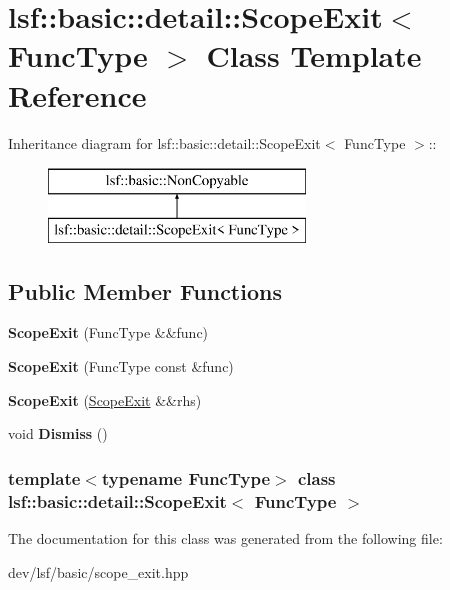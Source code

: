 \hypertarget{classlsf_1_1basic_1_1detail_1_1ScopeExit}{
\section{lsf::basic::detail::ScopeExit$<$ FuncType $>$ Class Template Reference}
\label{classlsf_1_1basic_1_1detail_1_1ScopeExit}
}
Inheritance diagram for lsf::basic::detail::ScopeExit$<$ FuncType $>$::\begin{figure}[H]
\begin{center}
\leavevmode
\includegraphics[height=2cm]{classlsf_1_1basic_1_1detail_1_1ScopeExit}
\end{center}
\end{figure}
\subsection*{Public Member Functions}
\begin{DoxyCompactItemize}
\item 
\hypertarget{classlsf_1_1basic_1_1detail_1_1ScopeExit_a602ab91f3a349ddd1934931d90e57fb1}{
{\bfseries ScopeExit} (FuncType \&\&func)}
\label{classlsf_1_1basic_1_1detail_1_1ScopeExit_a602ab91f3a349ddd1934931d90e57fb1}

\item 
\hypertarget{classlsf_1_1basic_1_1detail_1_1ScopeExit_af772cc24ed6fa8880780806fbf9296a9}{
{\bfseries ScopeExit} (FuncType const \&func)}
\label{classlsf_1_1basic_1_1detail_1_1ScopeExit_af772cc24ed6fa8880780806fbf9296a9}

\item 
\hypertarget{classlsf_1_1basic_1_1detail_1_1ScopeExit_a1693a60fbc69ad8df4452697b33e328c}{
{\bfseries ScopeExit} (\hyperlink{classlsf_1_1basic_1_1detail_1_1ScopeExit}{ScopeExit} \&\&rhs)}
\label{classlsf_1_1basic_1_1detail_1_1ScopeExit_a1693a60fbc69ad8df4452697b33e328c}

\item 
\hypertarget{classlsf_1_1basic_1_1detail_1_1ScopeExit_a950a04b52bd0ef20da3a3607a9561e2a}{
void {\bfseries Dismiss} ()}
\label{classlsf_1_1basic_1_1detail_1_1ScopeExit_a950a04b52bd0ef20da3a3607a9561e2a}

\end{DoxyCompactItemize}
\subsubsection*{template$<$typename FuncType$>$ class lsf::basic::detail::ScopeExit$<$ FuncType $>$}



The documentation for this class was generated from the following file:\begin{DoxyCompactItemize}
\item 
dev/lsf/basic/scope\_\-exit.hpp\end{DoxyCompactItemize}
